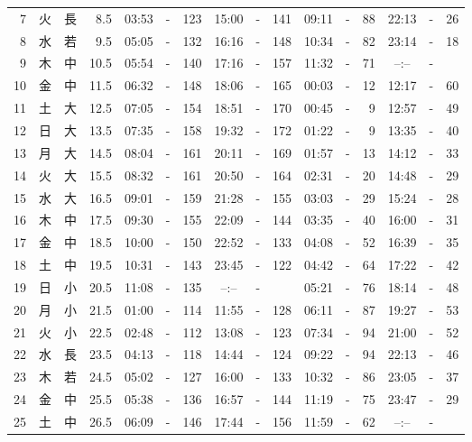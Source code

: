 \documentclass[12pt.a4j]{jsarticle}
\begin{document}
\begin{center}
\begin{table}[ht]
\begin{tabular}{|rc|cr|ccrccr|ccrccr|}
 7 & 火 & 長 &  8.5 &  03:53 &-& 123  &  15:00 &-& 141  &   09:11 &-&  88  &   22:13 &-&  26  \\
 8 & 水 & 若 &  9.5 &  05:05 &-& 132  &  16:16 &-& 148  &   10:34 &-&  82  &   23:14 &-&  18  \\
 9 & 木 & 中 & 10.5 &  05:54 &-& 140  &  17:16 &-& 157  &   11:32 &-&  71  &   --:-- &-&     \\
10 & 金 & 中 & 11.5 &  06:32 &-& 148  &  18:06 &-& 165  &   00:03 &-&  12  &   12:17 &-&  60  \\
11 & 土 & 大 & 12.5 &  07:05 &-& 154  &  18:51 &-& 170  &   00:45 &-&   9  &   12:57 &-&  49  \\
12 & 日 & 大 & 13.5 &  07:35 &-& 158  &  19:32 &-& 172  &   01:22 &-&   9  &   13:35 &-&  40  \\
13 & 月 & 大 & 14.5 &  08:04 &-& 161  &  20:11 &-& 169  &   01:57 &-&  13  &   14:12 &-&  33  \\
14 & 火 & 大 & 15.5 &  08:32 &-& 161  &  20:50 &-& 164  &   02:31 &-&  20  &   14:48 &-&  29  \\
15 & 水 & 大 & 16.5 &  09:01 &-& 159  &  21:28 &-& 155  &   03:03 &-&  29  &   15:24 &-&  28  \\
16 & 木 & 中 & 17.5 &  09:30 &-& 155  &  22:09 &-& 144  &   03:35 &-&  40  &   16:00 &-&  31  \\
17 & 金 & 中 & 18.5 &  10:00 &-& 150  &  22:52 &-& 133  &   04:08 &-&  52  &   16:39 &-&  35  \\
18 & 土 & 中 & 19.5 &  10:31 &-& 143  &  23:45 &-& 122  &   04:42 &-&  64  &   17:22 &-&  42  \\
19 & 日 & 小 & 20.5 &  11:08 &-& 135  &  --:-- &-&     &   05:21 &-&  76  &   18:14 &-&  48  \\
20 & 月 & 小 & 21.5 &  01:00 &-& 114  &  11:55 &-& 128  &   06:11 &-&  87  &   19:27 &-&  53  \\
21 & 火 & 小 & 22.5 &  02:48 &-& 112  &  13:08 &-& 123  &   07:34 &-&  94  &   21:00 &-&  52  \\
22 & 水 & 長 & 23.5 &  04:13 &-& 118  &  14:44 &-& 124  &   09:22 &-&  94  &   22:13 &-&  46  \\
23 & 木 & 若 & 24.5 &  05:02 &-& 127  &  16:00 &-& 133  &   10:32 &-&  86  &   23:05 &-&  37  \\
24 & 金 & 中 & 25.5 &  05:38 &-& 136  &  16:57 &-& 144  &   11:19 &-&  75  &   23:47 &-&  29  \\
25 & 土 & 中 & 26.5 &  06:09 &-& 146  &  17:44 &-& 156  &   11:59 &-&  62  &   --:-- &-&     \\

\end{tabular}
\end{table}
\end{center}
\end{document}
